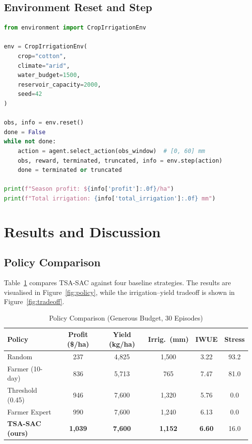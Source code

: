 \documentclass[12pt, a4paper]{article}
\begin{document}
\subsection{Environment Reset and Step}
\begin{lstlisting}[language=Python, caption={Custom Environment Usage}]
from environment import CropIrrigationEnv

env = CropIrrigationEnv(
    crop="cotton",
    climate="arid",
    water_budget=1500,
    reservoir_capacity=2000,
    seed=42
)

obs, info = env.reset()
done = False
while not done:
    action = agent.select_action(obs_window)  # [0, 60] mm
    obs, reward, terminated, truncated, info = env.step(action)
    done = terminated or truncated

print(f"Season profit: ${info['profit']:.0f}/ha")
print(f"Total irrigation: {info['total_irrigation']:.0f} mm")
\end{lstlisting}

\section{Results and Discussion}

\subsection{Policy Comparison}
Table~\ref{tab:baseline} compares TSA-SAC against four baseline strategies. The results are visualised in Figure~\ref{fig:policy}, while the irrigation--yield tradeoff is shown in Figure~\ref{fig:tradeoff}.

\begin{table}[H]
\centering
\caption{Policy Comparison (Generous Budget, 30 Episodes)}
\label{tab:baseline}
\begin{tabular}{lccccc}
\toprule
\textbf{Policy} & \textbf{Profit (\$/ha)} & \textbf{Yield (kg/ha)} & \textbf{Irrig.\ (mm)} & \textbf{IWUE} & \textbf{Stress} \\
\midrule
Random & 237 & 4,825 & 1,500 & 3.22 & 93.2 \\
Farmer (10-day) & 836 & 5,713 & 765 & 7.47 & 81.0 \\
Threshold (0.45) & 946 & 7,600 & 1,320 & 5.76 & 0.0 \\
Farmer Expert & 990 & 7,600 & 1,240 & 6.13 & 0.0 \\
\textbf{TSA-SAC (ours)} & \textbf{1,039} & \textbf{7,600} & \textbf{1,152} & \textbf{6.60} & 16.0 \\
\bottomrule
\end{tabular}
\end{table}
\end{document}
